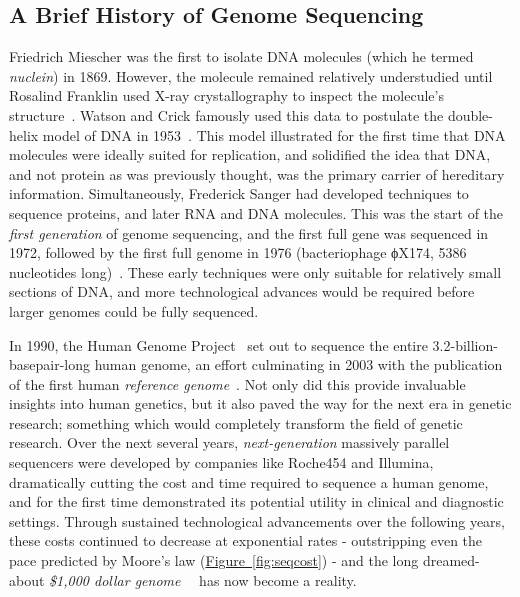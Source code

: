 \begin{justify}
\subsection{A Brief History of Genome Sequencing}
Friedrich Miescher was the first to isolate DNA molecules (which he termed \emph{nuclein}) in 1869. However, the molecule remained relatively understudied until Rosalind Franklin used X-ray crystallography to inspect the molecule's structure~\cite{elkin2003rosalind}. Watson and Crick famously used this data to postulate the double-helix model of DNA in 1953~\cite{watson1953molecular}. This model illustrated for the first time that DNA molecules were ideally suited for replication, and solidified the idea that DNA, and not protein as was previously thought, was the primary carrier of hereditary information. Simultaneously, Frederick Sanger had developed techniques to sequence proteins, and later RNA and DNA molecules. This was the start of the \emph{first generation} of genome sequencing, and the first full gene was sequenced in 1972, followed by the first full genome in 1976 (bacteriophage ϕX174, 5386 nucleotides long)~\cite{sanger1977dna}. These early techniques were only suitable for relatively small sections of DNA, and more technological advances would be required before larger genomes could be fully sequenced.

In 1990, the Human Genome Project~\cite{olson1993human} set out to sequence the entire 3.2-billion-basepair-long human genome, an effort culminating in 2003 with the publication of the first human \textit{reference genome}~\cite{international2004finishing}. Not only did this provide invaluable insights into human genetics, but it also paved the way for the next era in genetic research; something which would completely transform the field of genetic research. Over the next several years, \emph{next-generation} massively parallel sequencers were developed by companies like Roche454 and Illumina, dramatically cutting the cost and time required to sequence a human genome, and for the first time demonstrated its potential utility in clinical and diagnostic settings. Through sustained technological advancements over the following years, these costs continued to decrease at exponential rates - outstripping even the pace predicted by Moore's law (\hyperref[fig:seqcost]{Figure~\ref{fig:seqcost}}) - and the long dreamed-about \textit{\$1,000 dollar genome}~\cite{thousanddollargenome}~\cite{sequencingcostsNHGRI} has now become a reality.


\end{justify}
